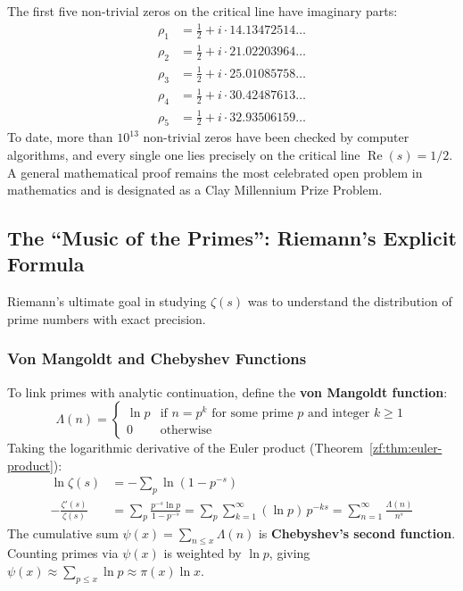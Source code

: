 \documentclass[a4paper]{article}
\begin{document}
The first five non-trivial zeros on the critical line have imaginary parts:
\begin{align*}
    \rho_1 &= \frac{1}{2} + i \cdot 14.13472514\dots \\
    \rho_2 &= \frac{1}{2} + i \cdot 21.02203964\dots \\
    \rho_3 &= \frac{1}{2} + i \cdot 25.01085758\dots \\
    \rho_4 &= \frac{1}{2} + i \cdot 30.42487613\dots \\
    \rho_5 &= \frac{1}{2} + i \cdot 32.93506159\dots
\end{align*}
To date, more than $10^{13}$ non-trivial zeros have been checked by computer algorithms, and every single one lies precisely on the critical line $\operatorname{Re}(s) = 1/2$. A general mathematical proof remains the most celebrated open problem in mathematics and is designated as a Clay Millennium Prize Problem.

\subsection{The ``Music of the Primes'': Riemann's Explicit Formula}\label{zf:subsec:music-of-primes}

Riemann's ultimate goal in studying $\zeta(s)$ was to understand the distribution of prime numbers with exact precision.

\subsubsection{Von Mangoldt and Chebyshev Functions}
To link primes with analytic continuation, define the \textbf{von Mangoldt function}:
\begin{equation}
    \Lambda(n) = \begin{cases}
        \ln p & \text{if } n = p^k \text{ for some prime } p \text{ and integer } k \ge 1 \\
        0 & \text{otherwise}
    \end{cases}
\end{equation}
Taking the logarithmic derivative of the Euler product (Theorem~\ref{zf:thm:euler-product}):
\begin{align*}
    \ln \zeta(s) &= - \sum_{p} \ln(1 - p^{-s}) \\
    -\frac{\zeta'(s)}{\zeta(s)} &= \sum_{p} \frac{p^{-s} \ln p}{1 - p^{-s}} = \sum_{p} \sum_{k=1}^\infty (\ln p) \, p^{-k s} = \sum_{n=1}^\infty \frac{\Lambda(n)}{n^s}
\end{align*}
The cumulative sum $\psi(x) = \sum_{n \le x} \Lambda(n)$ is \textbf{Chebyshev's second function}. Counting primes via $\psi(x)$ is weighted by $\ln p$, giving $\psi(x) \approx \sum_{p \le x} \ln p \approx \pi(x) \ln x$.
\end{document}
